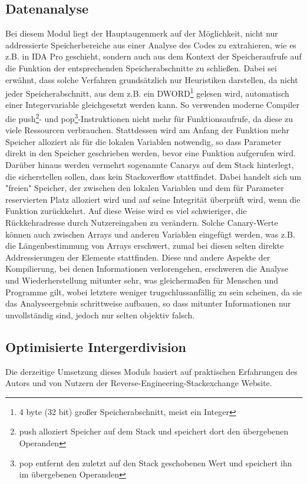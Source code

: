 \documentclass[11pt]{article} %
\begin{document}
\begin{multicols}{2}
\subsection{Datenanalyse}
Bei diesem Modul liegt der Hauptaugenmerk auf der Möglichkeit, nicht nur addressierte Speicherbereiche aus einer Analyse des Codes zu extrahieren, wie es z.B. in IDA Pro geschieht, sondern auch aus dem Kontext der Speicheraufrufe auf die Funktion der entsprechenden Speicherabschnitte zu schließen. Dabei sei erwähnt, dass solche Verfahren grundsätzlich nur Heuristiken darstellen, da nicht jeder Speicherabschnitt, aus dem z.B. ein DWORD\footnote{4 byte (32 bit) großer Speicherabschnitt, meist ein Integer} gelesen wird, automatisch einer Integervariable gleichgesetzt werden kann. So verwenden moderne Compiler die push\footnote{push alloziert Speicher auf dem Stack und speichert dort den übergebenen Operanden}- und pop\footnote{pop entfernt den zuletzt auf den Stack geschobenen Wert und speichert ihn im übergebenen Operanden}-Instruktionen nicht mehr für Funktionsaufrufe, da diese zu viele Ressourcen verbrauchen. Stattdessen wird am Anfang der Funktion mehr Speicher alloziert als für die lokalen Variablen notwendig, so dass Parameter direkt in den Speicher geschrieben werden, bevor eine Funktion aufgerufen wird. Darüber hinaus werden vermehrt sogenannte Canarys auf dem Stack hinterlegt, die sicherstellen sollen, dass kein Stackoverflow stattfindet. Dabei handelt sich um "freien" Speicher, der zwischen den lokalen Variablen und dem für Parameter reservierten Platz alloziert wird und auf seine Integrität überprüft wird, wenn die Funktion zurückkehrt. Auf diese Weise wird es viel schwieriger, die Rückkehradresse durch Nutzereingaben zu verändern. Solche Canary-Werte können auch zwischen Arrays und anderen Variablen eingefügt werden, was z.B. die Längenbestimmung von Arrays erschwert, zumal bei diesen selten direkte Addressierungen der Elemente stattfinden. Diese und andere Aspekte der Kompilierung, bei denen Informationen verlorengehen, erschweren die Analyse und Wiederherstellung mitunter sehr, was gleichermaßen für Menschen und Programme gilt, wobei letztere weniger trugschlussanfällig zu sein scheinen, da sie das Analyseergebnis schrittweise aufbauen, so dass mitunter Informationen nur unvollständig sind, jedoch nur selten objektiv falsch.

\subsection{Optimisierte Intergerdivision}
Die derzeitige Umsetzung dieses Moduls basiert auf praktischen Erfahrungen des Autors und von Nutzern der Reverse-Engineering-Stackexchange Website\cite{stackexchange:1}. 




\end{multicols}
\end{document}
